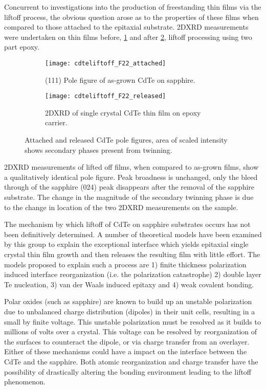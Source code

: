 Concurrent to investigations into the production of freestanding thin films via the liftoff process, the obvious question arose as to the properties of these films when compared to those attached to the epitaxial substrate.
2DXRD measurements were undertaken on thin films before, \cref{fig:cdteliftoff_F22_attached} and after \cref{fig:cdteliftoff_F22_released}, liftoff processing using two part epoxy.
\begin{figure}
 \centering
 \begin{subfigure}[b]{0.45\textwidth}
  \centering \texttt{[image: cdteliftoff\_F22\_attached]}
  \caption{\label{fig:cdteliftoff_F22_attached}(111) Pole figure of as-grown CdTe on sapphire.}
 \end{subfigure}\quad%
 \begin{subfigure}[b]{0.45\textwidth}
  \centering \texttt{[image: cdteliftoff\_F22\_released]}
  \caption{\label{fig:cdteliftoff_F22_released}2DXRD of single crystal CdTe thin film on epoxy carrier.}
 \end{subfigure}%
 \caption{\label{fig:cdteliftoff_2DXRD}Attached and released CdTe pole figures, area of scaled intensity shows secondary phases present from twinning.}
\end{figure}
2DXRD measurements of lifted off films, when compared to as-grown films, show a qualitatively identical pole figure.
Peak broadness is unchanged, only the bleed through of the sapphire (024) peak disappears after the removal of the sapphire substrate.
The change in the magnitude of the secondary twinning phase is due to the change in location of the two 2DXRD measurements on the sample.

The mechanism by which liftoff of CdTe on sapphire substrates occurs has not been definitively determined.
A number of theoretical models have been examined by this group to explain the exceptional interface which yields epitaxial single crystal thin film growth and then releases the resulting film with little effort.
The models proposed to explain such a process are 1) finite thickness polarization induced interface reorganization (i.e. the polarization catastrophe) 2) double layer Te nucleation, 3) van der Waals induced epitaxy and 4) weak covalent bonding.

Polar oxides (such as sapphire) are known to build up an unstable polarization due to unbalanced charge distribution (dipoles) in their unit cells, resulting in a small by finite voltage.
This unstable polarization must be resolved as it builds to millions of volts over a crystal.
This voltage can be resolved by reorganization of the surfaces to counteract the dipole, or via charge transfer from an overlayer.
Either of these mechanisms could have a impact on the interface between the CdTe and the sapphire.
Both atomic reorganization and charge transfer have the possibility of drastically altering the bonding environment leading to the liftoff phenomenon.

